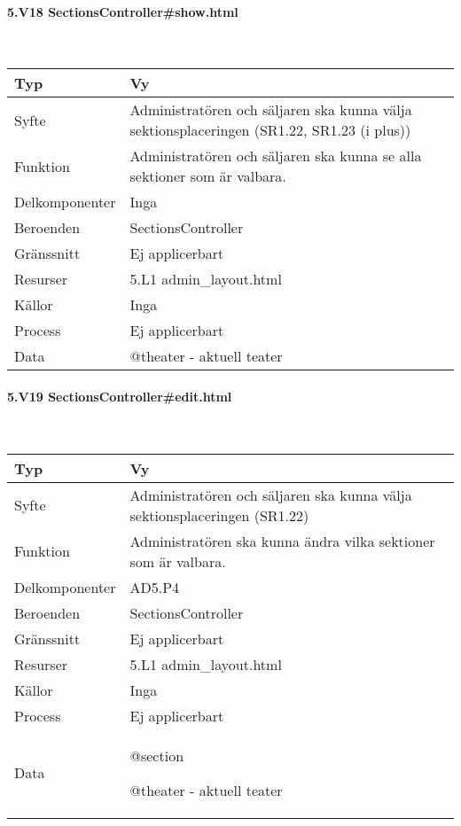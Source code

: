 \documentclass[a4paper, twoside, 11pt, titlepage]{article}
\begin{document}
			\paragraph{5.V18 SectionsController\#show.html}\

			\begin {table} [ht] \begin{tabular} {  p{3.5cm} p{9.6cm} }
				\hline
				{Typ} & {Vy} \\
				\hline
				{Syfte} & {Administratören och säljaren ska kunna välja sektionsplaceringen (SR1.22, SR1.23 (i plus))} \\
				\hline
				{Funktion} & {Administratören och säljaren ska kunna se alla sektioner som är valbara.} \\
				\hline
				{Delkomponenter} & {Inga} \\
				\hline
				{Beroenden} & {SectionsController} \\
				\hline
				{Gränssnitt} & {Ej applicerbart} \\
				\hline
				{Resurser} & {5.L1 admin\_layout.html} \\
				\hline
				{Källor} & {Inga} \\
				\hline
				{Process} & {Ej applicerbart} \\
				\hline
				{Data} & {@theater - aktuell teater} \\
				\hline
			\end{tabular} \end{table} \FloatBarrier


			\paragraph{5.V19 SectionsController\#edit.html}\

			\begin {table} [ht] \begin{tabular} {  p{3.5cm} p{9.6cm} }
				\hline
				{Typ} & {Vy} \\
				\hline
				{Syfte} & {Administratören och säljaren ska kunna välja sektionsplaceringen (SR1.22)} \\
				\hline
				{Funktion} & {Administratören ska kunna ändra vilka sektioner som är valbara.} \\
				\hline
				{Delkomponenter} & {AD5.P4} \\
				\hline
				{Beroenden} & {SectionsController} \\
				\hline
				{Gränssnitt} & {Ej applicerbart} \\
				\hline
				{Resurser} & {5.L1 admin\_layout.html} \\
				\hline
				{Källor} & {Inga} \\
				\hline
				{Process} & {Ej applicerbart} \\
				\hline
				{Data} & {@section

@theater - aktuell teater} \\
				\hline
			\end{tabular} \end{table} \FloatBarrier
\end{document}
